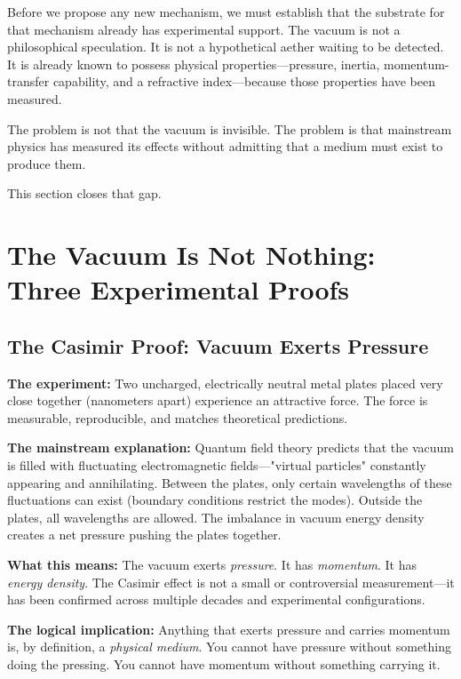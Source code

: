 \documentclass[12pt, a4paper]{article}
\begin{document}
Before we propose any new mechanism, we must establish that the substrate for that mechanism already has experimental support. The vacuum is not a philosophical speculation. It is not a hypothetical aether waiting to be detected. It is already known to possess physical properties—pressure, inertia, momentum-transfer capability, and a refractive index—because those properties have been measured.

The problem is not that the vacuum is invisible. The problem is that mainstream physics has measured its effects without admitting that a medium must exist to produce them.

This section closes that gap.

\section{The Vacuum Is Not Nothing: Three Experimental Proofs}
\label{sec:three_proofs}

\subsection{The Casimir Proof: Vacuum Exerts Pressure}
\label{subsec:casimir}

\textbf{The experiment:} Two uncharged, electrically neutral metal plates placed very close together (nanometers apart) experience an attractive force. The force is measurable, reproducible, and matches theoretical predictions.

\textbf{The mainstream explanation:} Quantum field theory predicts that the vacuum is filled with fluctuating electromagnetic fields—"virtual particles" constantly appearing and annihilating. Between the plates, only certain wavelengths of these fluctuations can exist (boundary conditions restrict the modes). Outside the plates, all wavelengths are allowed. The imbalance in vacuum energy density creates a net pressure pushing the plates together.

\textbf{What this means:} The vacuum exerts \textit{pressure}. It has \textit{momentum}. It has \textit{energy density}. The Casimir effect is not a small or controversial measurement—it has been confirmed across multiple decades and experimental configurations.

\textbf{The logical implication:} Anything that exerts pressure and carries momentum is, by definition, a \textit{physical medium}. You cannot have pressure without something doing the pressing. You cannot have momentum without something carrying it.
\end{document}
